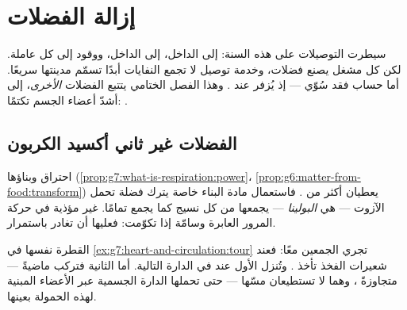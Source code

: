 \chapter{إزالة الفضلات}\label{ch:g7:removing-wastes}

سيطرت التوصيلات على هذه السنة:  إلى الداخل،  إلى
الداخل، ووقود إلى كل  عاملة. لكن كل مشغل يصنع فضلات، وخدمة
توصيل لا تجمع النفايات أبدًا تسمّم مدينتها سريعًا. أما حساب  فقد سُوّي --- إذ يُزفر عند . وهذا الفصل
الختامي يتتبع الفضلات \emph{الأخرى}، إلى أشدّ أعضاء الجسم تكتمًا:
.

\section{الفضلات غير ثاني أكسيد الكربون}

\begin{proposition}\label{prop:g7:removing-wastes:rubbish}
احتراق  وبناؤها
(\cref{prop:g7:what-is-respiration:power}،
\cref{prop:g6:matter-from-food:transform}) يعطيان أكثر من . فاستعمال  مادة البناء خاصة يترك فضلة تحمل
الآزوت --- هي \emph{البولينا} --- يجمعها  من كل
نسيج كما يجمع  تمامًا.  غير مؤذية في
حركة المرور العابرة وسامّة إذا تكوّمت: فعليها أن تغادر باستمرار.
\end{proposition}
\admitted

\begin{example}\label{ex:g7:removing-wastes:rounds}
القطرة نفسها في \cref{ex:g7:heart-and-circulation:tour} تجري
الجمعين معًا: فعند شعيرات الفخذ تأخذ 
\emph{}. وتُنزل الأول عند  في الدارة التالية. أما
الثانية فتركب ماضيةً --- متجاوزةً ، وهما لا تستطيعان مسّها
--- حتى تحملها الدارة الجسمية عبر الأعضاء المبنية لهذه الحمولة
بعينها.
\end{example}

